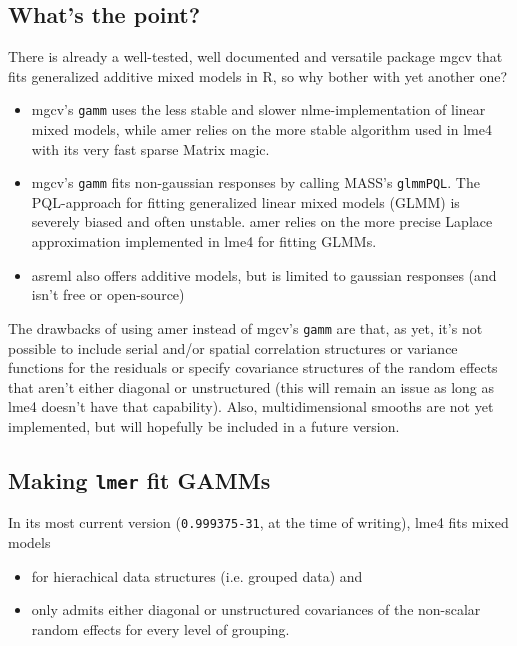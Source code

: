 \documentclass[12pt]{article}
\newcommand{\code}[1]{\texttt{\small{#1}}}
\newcommand{\package}[1]{\textsf{\small{#1}}}
\newcommand{\R}{\textsf{R}}
\begin{document}
\subsection{What's the point?}
There is already a well-tested, well documented and versatile package
\package{mgcv} \citep{mgcv} that fits generalized additive mixed models in
\R, so why bother with yet another one?
\begin{itemize}
	\item \package{mgcv}'s \code{gamm} uses the less stable and slower
\package{nlme}-implementation of linear mixed models, while \package{amer} relies
on the more stable algorithm used in \package{lme4} \citep{lme4} with its very
fast sparse \package{Matrix} \citep{Matrix} magic. 
	\item \package{mgcv}'s \code{gamm} fits non-gaussian responses by calling
\package{MASS}'s \code{glmmPQL}. The PQL-approach for fitting generalized linear mixed models
(GLMM) is severely biased and often unstable.  \package{amer} relies on the more
precise Laplace approximation implemented in \package{lme4} for fitting GLMMs.
	\item \package{asreml} also offers additive models, but is limited to gaussian
responses (and isn't free or open-source)
\end{itemize} 
The drawbacks of using \package{amer} instead of \package{mgcv}'s \code{gamm}
are that, as yet, it's not possible to include serial and/or spatial correlation
structures or variance functions for the residuals or specify covariance
structures of the random effects that aren't either diagonal or unstructured
(this will remain an issue as long as \package{lme4} doesn't have that
capability). Also, multidimensional smooths are not yet implemented, but will
hopefully be included in a future version.

\subsection{Making \code{lmer} fit GAMMs}
In its most current version (\texttt{0.999375-31}, at the time of writing), 
\package{lme4} fits mixed models
\begin{itemize}
\item for hierachical data structures (i.e. grouped data) and
\item only admits either diagonal or unstructured covariances of the non-scalar random 
effects for every level of grouping.
\end{itemize}
\end{document}
